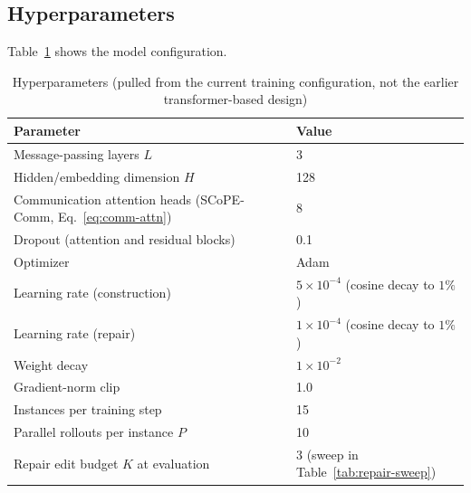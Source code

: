 \subsection{Hyperparameters}

Table~\ref{tab:hyperparameters} shows the model configuration.

\begin{table}[htbp]
\centering
\small
\caption{Hyperparameters (pulled from the current training configuration, not the earlier transformer-based design)}
\label{tab:hyperparameters}
\begin{tabular}{ll}
\hline
\textbf{Parameter} & \textbf{Value} \\ \hline
Message-passing layers $L$ & 3 \\
Hidden/embedding dimension $H$ & 128 \\
Communication attention heads (SCoPE-Comm, Eq.~\eqref{eq:comm-attn}) & 8 \\
Dropout (attention and residual blocks) & 0.1 \\
Optimizer & Adam \\
Learning rate (construction) & $5 \times 10^{-4}$ (cosine decay to $1\%$) \\
Learning rate (repair) & $1 \times 10^{-4}$ (cosine decay to $1\%$) \\
Weight decay & $1 \times 10^{-2}$ \\
Gradient-norm clip & 1.0 \\
Instances per training step & 15 \\
Parallel rollouts per instance $P$ & 10 \\
Repair edit budget $K$ at evaluation & 3 (sweep in Table~\ref{tab:repair-sweep}) \\ \hline
\end{tabular}
\end{table}


